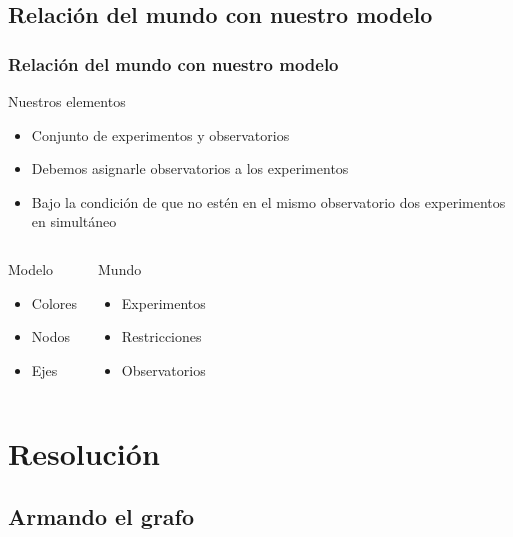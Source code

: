 \documentclass[table,dvipsnames]{beamer}
\begin{document}
\subsection{Relaci\'on del mundo con nuestro modelo}
\begin{frame}
\frametitle{Relaci\'on del mundo con nuestro modelo}

Nuestros elementos
\begin{itemize}
\item Conjunto de experimentos y observatorios
\item Debemos asignarle observatorios a los experimentos
\item Bajo la condici\'on de que no est\'en en el mismo observatorio dos experimentos en simult\'aneo
\end{itemize}

\begin{columns}
\column{4cm}
\begin{block}{\Large Modelo}
\begin{itemize}
\item Colores
\item Nodos
\item Ejes
\end{itemize}
\end{block}

\column{4cm}
\begin{block}{\Large Mundo}
\begin{itemize}
\item Experimentos
\item Restricciones
\item Observatorios
\end{itemize}
\end{block}

\end{columns}

\end{frame}

\section{Resoluci\'on}
\subsection{Armando el grafo}
\begin{frame}[t]
\begin{center}


\vspace{20pt}

\end{center}

\end{frame}
\end{document}
